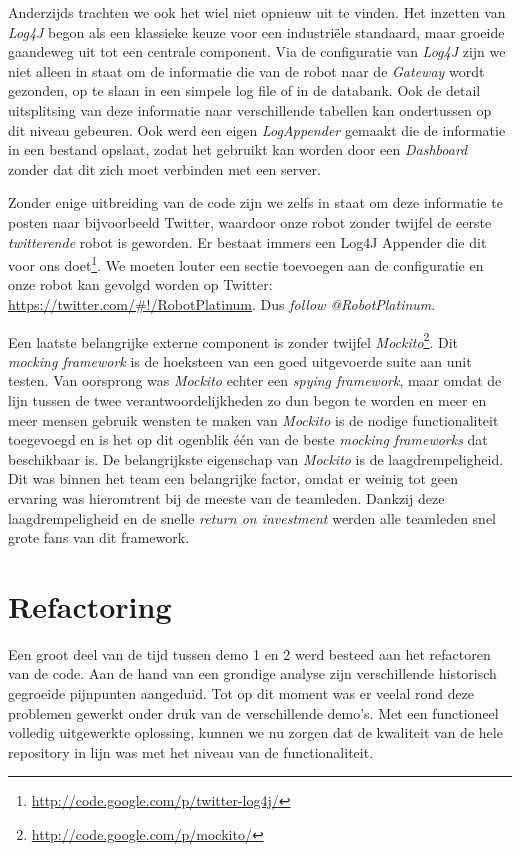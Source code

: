 \documentclass[12pt,a4paper]{report}
\begin{document}
Anderzijds trachten we ook het wiel niet opnieuw uit te vinden. Het inzetten van \emph{Log4J} begon als een klassieke keuze voor een industri\"ele standaard, maar groeide gaandeweg uit tot een centrale component. Via de configuratie van \emph{Log4J} zijn we niet alleen in staat om de informatie die van de robot naar de \emph{Gateway} wordt gezonden, op te slaan in een simpele log file of in de databank. Ook de detail uitsplitsing van deze informatie naar verschillende tabellen kan ondertussen op dit niveau gebeuren. Ook werd een eigen \emph{LogAppender} gemaakt die de informatie in een bestand opslaat, zodat het gebruikt kan worden door een \emph{Dashboard} zonder dat dit zich moet verbinden met een server.

Zonder enige uitbreiding van de code zijn we zelfs in staat om deze informatie te posten naar bijvoorbeeld Twitter, waardoor onze robot zonder twijfel de eerste \emph{twitterende} robot is geworden. Er bestaat immers een Log4J Appender die dit voor ons doet\footnote{\url{http://code.google.com/p/twitter-log4j/}}. We moeten louter een sectie toevoegen aan de configuratie en onze robot kan gevolgd worden op Twitter: \url{https://twitter.com/\#!/RobotPlatinum}. Dus \emph{follow @RobotPlatinum}.

Een laatste belangrijke externe component is zonder twijfel \emph{Mockito}\footnote{\url{http://code.google.com/p/mockito/}}. Dit \emph{mocking framework} is de hoeksteen van een goed uitgevoerde suite aan unit testen. Van oorsprong was \emph{Mockito} echter een \emph{spying framework}, maar omdat de lijn tussen de twee verantwoordelijkheden zo dun begon te worden en meer en meer mensen gebruik wensten te maken van \emph{Mockito} is de nodige functionaliteit toegevoegd en is het op dit ogenblik \'e\'en van de beste \emph{mocking frameworks} dat beschikbaar is. De belangrijkste eigenschap van \emph{Mockito} is de laagdrempeligheid. Dit was binnen het team een belangrijke factor, omdat er weinig tot geen ervaring was hieromtrent bij de meeste van de teamleden. Dankzij deze laagdrempeligheid en de snelle \emph{return on investment} werden alle teamleden snel grote fans van dit framework.

\section{Refactoring}

Een groot deel van de tijd tussen demo 1 en 2 werd besteed aan het refactoren van de code. Aan de hand van een grondige analyse zijn verschillende historisch gegroeide pijnpunten aangeduid. Tot op dit moment was er veelal rond deze problemen gewerkt onder druk van de verschillende demo's. Met een functioneel volledig uitgewerkte oplossing, kunnen we nu zorgen dat de kwaliteit van de hele repository in lijn was met het niveau van de functionaliteit.
\end{document}

